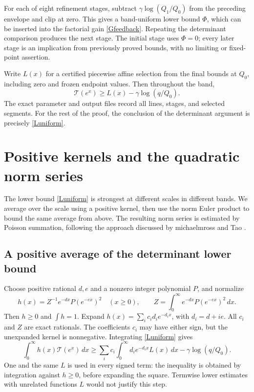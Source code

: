 \documentclass[11pt]{article}
\newcommand{\Tn}{\mathcal T}
\begin{document}
For each of eight refinement stages, subtract
\(\gamma\log(Q_1/Q_0)\) from the preceding envelope and clip at
zero. This gives a band-uniform lower bound \(\Phi\), which can be
inserted into the factorial gain \eqref{Gfeedback}. Repeating the
determinant comparison produces the next stage. The initial stage
uses \(\Phi=0\); every later stage is an implication from previously
proved bounds, with no limiting or fixed-point assertion.

Write \(L(x)\) for a certified piecewise affine selection from the
final bounds at \(Q_0\), including zero and frozen endpoint values.
Then throughout the band,
\begin{equation}\label{Luniform}
 \Tn(e^x)\ge L(x)-\gamma\log(q/Q_0).
\end{equation}
The exact parameter and output files record all lines, stages, and
selected segments. For the rest of the proof, the conclusion of the
determinant argument is precisely \eqref{Luniform}.

\section{Positive kernels and the quadratic norm series}\label{mellin}
The lower bound \eqref{Luniform} is strongest at different scales in
different bands. We average over the scale using a positive kernel,
then use the norm Euler product to bound the same average from above.
The resulting norm series is estimated by Poisson summation, following
the approach discussed by michaelmross and Tao \cite{ross,taocomment}.

\subsection{A positive average of the determinant lower bound}
Choose positive rational \(d,e\) and a nonzero integer polynomial
\(P\), and normalize
\[
 h(x)=Z^{-1}e^{-dx}P(e^{-ex})^2\quad(x\ge0),\qquad
 Z=\int_0^\infty e^{-dx}P(e^{-ex})^2\,dx.
\]
Then \(h\ge0\) and \(\int h=1\). Expand
\(h(x)=\sum_i c_i d_i e^{-d_i x}\), with \(d_i=d+ie\).
All \(c_i\) and \(Z\) are exact rationals. The coefficients \(c_i\)
may have either sign, but the unexpanded kernel is nonnegative.
Integrating
\eqref{Luniform} gives
\begin{equation}\label{weightedlower}
 \int_0^\infty h(x)\Tn(e^x)\,dx
 \ge\sum_i c_i\!\int_0^\infty d_i e^{-d_i x}L(x)\,dx
             -\gamma\log(q/Q_0).
\end{equation}
One and the same \(L\) is used in every signed term: the inequality
is obtained by integration against \(h\ge0\), before expanding the
square. Termwise lower estimates with unrelated functions \(L\)
would not justify this step.
\end{document}
